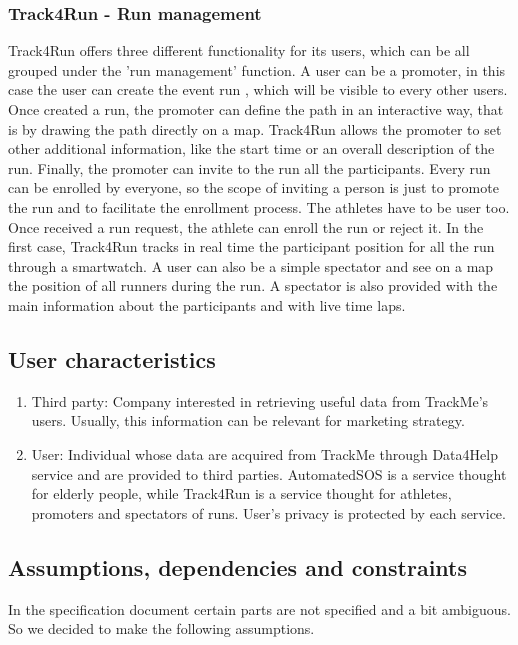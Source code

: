 \subsubsection{Track4Run - Run management}
Track4Run offers three different functionality for its users, which can be all grouped under the 'run management' function. A user can be a promoter, in this case the user can create the event run , which will be visible to every other users. Once created a run, the promoter can define the path in an interactive way, that is by drawing the path directly on a map. Track4Run allows the promoter to set other additional information, like the start time or an overall description of the run. Finally, the promoter can invite to the run all the participants. Every run can be enrolled by everyone, so the scope of inviting a person is just to promote the run and to facilitate the enrollment process.
\bigbreak
\noindent
The athletes have to be user too. Once received a run request, the athlete can enroll the run or reject it. In the first case, Track4Run tracks in real time the participant position for all the run through a smartwatch. 
\bigbreak
\noindent
A user can also be a simple spectator and see on a map the position of all runners during the run. A spectator is also provided with the main information about the participants and with live time laps.

\subsection{User characteristics}
\begin{enumerate}
\item Third party: Company interested in retrieving useful data from TrackMe's users. Usually, this information can be relevant for marketing strategy.

\item User: Individual whose data are acquired from TrackMe through Data4Help service and are provided to third parties. AutomatedSOS is a service thought for elderly people, while Track4Run is a service thought for athletes, promoters and spectators of runs. User's privacy is protected by each service.

\end{enumerate}

\subsection{Assumptions, dependencies and constraints}
In the specification document certain parts are not specified and a bit ambiguous. So we decided to make the following assumptions.

